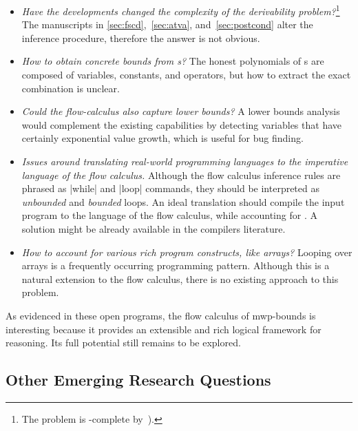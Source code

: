 \begin{itemize}
\item \emph{Have the developments changed the complexity of the derivability
        problem?}\footnote{The problem is -complete by~\cite[p.
        37]{jones2009}).}
      The manuscripts in \autoref{sec:fscd},~\autoref{sec:atva},
      and~\autoref{sec:postcond} alter the inference procedure, therefore the
      answer is not obvious.

\item \emph{How to obtain concrete bounds from s?}
      The honest polynomials of s are composed of variables,
      constants, and operators, but how to extract the exact combination is
      unclear.

\item \emph{Could the flow-calculus also capture lower bounds?}
      A lower bounds analysis would complement the existing capabilities by
      detecting variables that have certainly exponential value growth, which
      is useful \eg for bug finding.

\item \emph{Issues around translating real-world programming languages to the
      imperative language of the flow calculus.}
      Although the flow calculus inference rules are phrased as \pr|while| and
      \pr|loop| commands, they should be interpreted as \emph{unbounded} and
      \emph{bounded} loops. An ideal translation should compile the input
      program to the language of the flow calculus, while accounting for . A solution might be already available in the
      compilers literature.

\item \emph{How to account for various rich program constructs,
      like arrays?}
     Looping over arrays is a frequently occurring programming pattern.
     Although this is a natural extension to the flow calculus,
     there is no existing approach to this problem.

\end{itemize}

As evidenced in these open programs, the flow calculus of mwp-bounds is
interesting because it provides an extensible and rich logical framework for
reasoning. Its full potential still remains to be explored.

\subsection{Other Emerging Research Questions}
\label{ssec:other-open}


